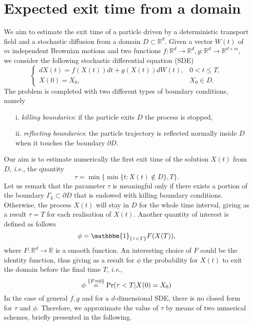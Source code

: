 \section{Expected exit time from a domain}
We aim to estimate the exit time of a particle driven by a deterministic transport field and a stochastic diffusion from a domain $D \subset \mathbb{R}^d$. Given a vector $W(t)$ of $m$ independent Brownian motions and two functions $f\colon \mathbb{R}^d \rightarrow \mathbb{R}^d, g \colon \mathbb{R}^d \rightarrow \mathbb{R}^{d\times m}$, we consider the following stochastic differential equation (SDE)
\begin{equation}\label{eq:GeneralModel}
\begin{cases}
	dX(t) = f(X(t)) dt + g(X(t))dW(t), & 0 < t \leq T, \\
	X(0)  = X_0, & X_0 \in D.
\end{cases}
\end{equation}
The problem is completed with two different types of boundary conditions, namely
\begin{itemize}
	\item[i.]  \textit{killing boundaries}: if the particle exits $D$ the process is stopped,
	\item[ii.] \textit{reflecting boundaries}: the particle trajectory is reflected normally inside $D$ when it touches the boundary $\partial D$.
\end{itemize}
Our aim is to estimate numerically the first exit time of the solution $X(t)$ from $D$, \textit{i.e.}, the quantity
\begin{equation}\label{eq:GeneralTau}
	\tau = \min\{\min\{t\colon X(t)\notin D\},T\}.
\end{equation}
Let us remark that the parameter $\tau$ is meaningful only if there exists a portion of the boundary $\Gamma_k \subset \partial D$ that is endowed with killing boundary conditions. Otherwise, the process $X(t)$ will stay in $D$ for the whole time interval, giving as a result $\tau = T$ for each realisation of $X(t)$. Another quantity of interest is defined as follows
\begin{equation}\label{eq:GeneralPhi}
	\phi = \mathbbm{1}_{\{\tau<T\}}F(X(T)),
\end{equation}
where $F\colon \mathbb{R}^d \rightarrow \mathbb{R}$ is a smooth function. An interesting choice of $F$ could be the identity function, thus giving as a result for $\phi$ the probability for $X(t)$ to exit the domain before the final time $T$, \textit{i.e.}, 
\begin{equation}\label{eq:ExitProb}
	\phi \stackrel{\{F\equiv0\}}{=} \Pr(\tau < T | X(0) = X_0)
\end{equation}
In the case of general $f,g$ and for a $d$-dimensional SDE, there is no closed form for $\tau$ and $\phi$. Therefore, we approximate the value of $\tau$ by means of two numerical schemes, briefly presented in the following.





